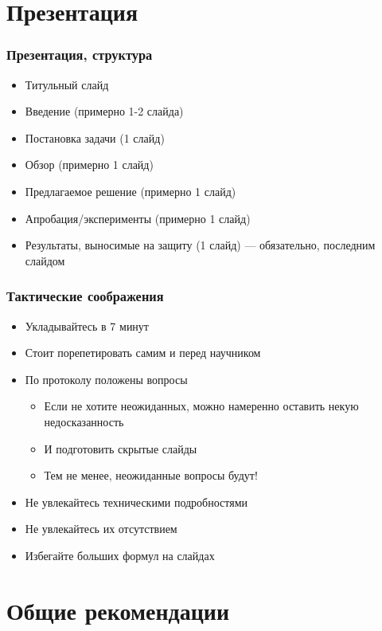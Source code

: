 \documentclass[xetex,mathserif,serif]{beamer}
\begin{document}
    \section{Презентация}

    \begin{frame}
        \frametitle{Презентация, структура}
        \begin{itemize}
            \item Титульный слайд
            \item Введение (примерно 1-2 слайда)
            \item Постановка задачи (1 слайд)
            \item Обзор (примерно 1 слайд)
            \item Предлагаемое решение (примерно 1 слайд)
            \item Апробация/эксперименты (примерно 1 слайд)
            \item Результаты, выносимые на защиту (1 слайд) --- обязательно, последним слайдом
        \end{itemize}
    \end{frame}

    \begin{frame}
        \frametitle{Тактические соображения}
        \begin{itemize}
            \item Укладывайтесь в 7 минут
            \item Стоит порепетировать самим и перед научником
            \item По протоколу положены вопросы
            \begin{itemize}
                \item Если не хотите неожиданных, можно намеренно оставить некую недосказанность
                \item И подготовить скрытые слайды
                \item Тем не менее, неожиданные вопросы будут!
            \end{itemize}
            \item Не увлекайтесь техническими подробностями
            \item Не увлекайтесь их отсутствием
            \item Избегайте больших формул на слайдах
        \end{itemize}
    \end{frame}

    \section{Общие рекомендации}
\end{document}
